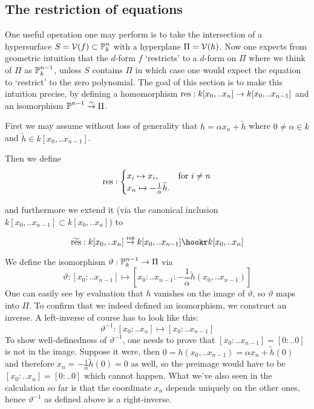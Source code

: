 \subsection{The restriction of equations}

One useful operation one may perform is to take the intersection of a hypersurface $S = \operatorname{\mathcal V}(f) \subset \operatorname{\mathbb P}^n_k$ with a hyperplane $\Pi = \operatorname{\mathcal V}(h)$.
Now one expects from geometric intuition that the $d$-form $f$ `restricts' to a $d$-form on $\Pi$ where we think of $\Pi$ as $\operatorname{\mathbb P}^{n-1}_k$, unless $S$ contains $\Pi$ in which case one would expect the equation to `restrict' to the zero polynomial.
The goal of this section is to make this intuition precise, by defining a homomorphism ${\operatorname{res}} : k[x_0,..x_n] \to k[x_0,..x_{n-1}]$ and an isomorphism $\operatorname{\mathbb P}^{n-1} \overset\sim\to \Pi$.

First we may assume without loss of generality that
$h = \alpha x_n + \widetilde h$ where $0 \neq \alpha \in k$ and $\widetilde h \in k[x_0,..x_{n-1}]$.

Then we define
\begin{equation}
{\operatorname{res}} : \begin{cases}
x_i \mapsto x_i, & \text{for } i \neq n \\
x_n \mapsto -\frac 1\alpha \widetilde h. &
\end{cases}
\end{equation}

and furthermore we extend it (via the canonical inclusion $k[x_0,..x_{n-1}] \subset k[x_0,..x_n]$) to

\begin{equation}
\widetilde{\var{res}} : k[x_0,.. x_n] \overset{\var{res}}\to k[x_0,.. x_{n-1}] \hookr k[x_0,.. x_n]
\end{equation}

We define the isomorphism $\vartheta : \operatorname{\mathbb P}^{n-1}_k \to \Pi$ via
\begin{equation}
\vartheta : [x_0:..x_{n-1}] \mapsto [x_0:..x_{n-1}:-\frac 1\alpha \widetilde h(x_0,..x_{n-1})]
\end{equation}
One can easily see by evaluation that $h$ vanishes on the image of $\vartheta$, so $\vartheta$ maps into $\Pi$. To confirm that we indeed defined an isomorphism, we construct an inverse.
A left-inverse of course has to look like this:
\begin{equation}
\vartheta^{-1} : [x_0:..x_n] \mapsto [x_0:..x_{n-1}]
\end{equation}
To show well-definedness of $\vartheta^{-1}$, one needs to prove that $[x_0:..x_{n-1}] = [0:..0]$ is not in the image. Suppose it were, then $0 = h(x_0,..x_{n-1}) = \alpha x_n + \widetilde h(0)$ and therefore $x_n = -\frac 1\alpha \widetilde h(0) = 0$ as well, so the preimage would have to be $[x_0:..x_n] = [0:..0]$ which cannot happen.
What we've also seen in the calculation so far is that the coordinate $x_n$ depends uniquely on the other ones, hence $\vartheta^{-1}$ as defined above is a right-inverse.

